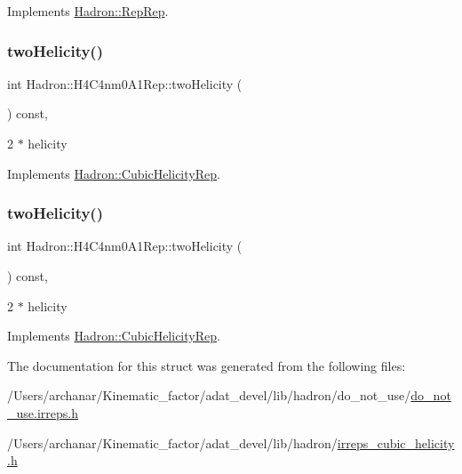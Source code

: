 Implements \mbox{\hyperlink{structHadron_1_1RepRep_ab3213025f6de249f7095892109575fde}{Hadron\+::\+Rep\+Rep}}.

\mbox{\label{structHadron_1_1H4C4nm0A1Rep_a3d1124ede0ce759e05e5f9a89fd4ef55}} 
\subsubsection{\texorpdfstring{twoHelicity()}{twoHelicity()}\hspace{0.1cm}{\footnotesize\ttfamily [1/2]}}
{\footnotesize\ttfamily int Hadron\+::\+H4\+C4nm0\+A1\+Rep\+::two\+Helicity (\begin{DoxyParamCaption}{ }\end{DoxyParamCaption}) const\hspace{0.3cm}{\ttfamily [inline]}, {\ttfamily [virtual]}}

2 $\ast$ helicity 

Implements \mbox{\hyperlink{structHadron_1_1CubicHelicityRep_af507aa56fc2747eacc8cb6c96db31ecc}{Hadron\+::\+Cubic\+Helicity\+Rep}}.

\mbox{\label{structHadron_1_1H4C4nm0A1Rep_a3d1124ede0ce759e05e5f9a89fd4ef55}} 
\subsubsection{\texorpdfstring{twoHelicity()}{twoHelicity()}\hspace{0.1cm}{\footnotesize\ttfamily [2/2]}}
{\footnotesize\ttfamily int Hadron\+::\+H4\+C4nm0\+A1\+Rep\+::two\+Helicity (\begin{DoxyParamCaption}{ }\end{DoxyParamCaption}) const\hspace{0.3cm}{\ttfamily [inline]}, {\ttfamily [virtual]}}

2 $\ast$ helicity 

Implements \mbox{\hyperlink{structHadron_1_1CubicHelicityRep_af507aa56fc2747eacc8cb6c96db31ecc}{Hadron\+::\+Cubic\+Helicity\+Rep}}.



The documentation for this struct was generated from the following files\+:\begin{DoxyCompactItemize}
\item 
/\+Users/archanar/\+Kinematic\+\_\+factor/adat\+\_\+devel/lib/hadron/do\+\_\+not\+\_\+use/\mbox{\hyperlink{do__not__use_8irreps_8h}{do\+\_\+not\+\_\+use.\+irreps.\+h}}\item 
/\+Users/archanar/\+Kinematic\+\_\+factor/adat\+\_\+devel/lib/hadron/\mbox{\hyperlink{lib_2hadron_2irreps__cubic__helicity_8h}{irreps\+\_\+cubic\+\_\+helicity.\+h}}\end{DoxyCompactItemize}
